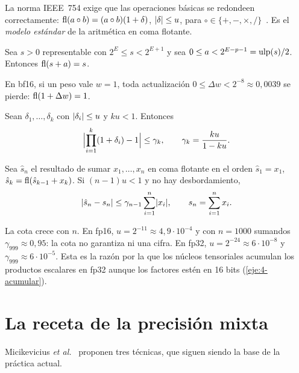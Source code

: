 La norma IEEE~754 exige que las operaciones básicas se redondeen correctamente: $\operatorname{fl}(a\circ b)=(a\circ b)(1+\delta)$, $\lvert\delta\rvert\le u$, para $\circ\in\{+,-,\times,/\}$~\cite[cap.~2]{higham}. Es el \emph{modelo estándar} de la aritmética en coma flotante.

\begin{lema}[Estancamiento]\label{lem:estancamiento}
Sea $s>0$ representable con $2^{E}\le s<2^{E+1}$ y sea $0\le a<2^{E-p-1}=\operatorname{ulp}(s)/2$. Entonces $\operatorname{fl}(s+a)=s$.
\end{lema}

\begin{corolario}\label{cor:actualizacion}
En bf16, si un peso vale $w=1$, toda actualización $0\le\Delta w<2^{-8}\approx 0{,}0039$ se pierde: $\operatorname{fl}(1+\Delta w)=1$.
\end{corolario}

\begin{lema}\label{lem:gamma}
Sean $\delta_1,\dots,\delta_k$ con $\lvert\delta_i\rvert\le u$ y $ku<1$. Entonces
\[
\Bigl\lvert\prod_{i=1}^{k}(1+\delta_i)-1\Bigr\rvert\le\gamma_k,\qquad\gamma_k=\frac{ku}{1-ku}.
\]
\end{lema}

\begin{teorema}\label{teo:suma}
Sea $\hat s_n$ el resultado de sumar $x_1,\dots,x_n$ en coma flotante en el orden $\hat s_1=x_1$, $\hat s_k=\operatorname{fl}(\hat s_{k-1}+x_k)$. Si $(n-1)u<1$ y no hay desbordamiento,
\[
\lvert\hat s_n-s_n\rvert\le\gamma_{n-1}\sum_{i=1}^{n}\lvert x_i\rvert,\qquad s_n=\sum_{i=1}^{n}x_i.
\]
\end{teorema}

La cota crece con $n$. En fp16, $u=2^{-11}\approx 4{,}9\cdot 10^{-4}$ y con $n=1000$ sumandos $\gamma_{999}\approx 0{,}95$: la cota no garantiza ni una cifra. En fp32, $u=2^{-24}\approx 6\cdot 10^{-8}$ y $\gamma_{999}\approx 6\cdot 10^{-5}$. Esta es la razón por la que los núcleos tensoriales acumulan los productos escalares en fp32 aunque los factores estén en 16 bits (\cref{eje:4-acumular}).

\section{La receta de la precisión mixta}

Micikevicius \emph{et al.}~\cite[§3]{micikevicius} proponen tres técnicas, que siguen siendo la base de la práctica actual.

